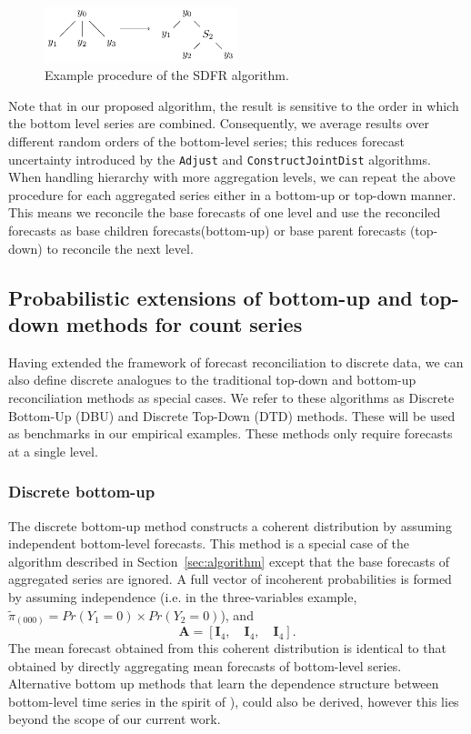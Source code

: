 \documentclass[a4paper,review,12pt,authoryear]{elsarticle}
\let\code=\texttt
\theoremstyle{definition}
\begin{document}
  \begin{figure}
    \centering
    \includegraphics[width=0.5\textwidth]{figures/sdfr.pdf}
    \caption{\label{fig:sdfr}Example procedure of the SDFR algorithm.}
  \end{figure}

  Note that in our proposed algorithm, the result is sensitive to the order in which the bottom level series are combined. Consequently, we average results over different random orders of the bottom-level series; this reduces forecast uncertainty introduced by the \code{Adjust} and \code{ConstructJointDist} algorithms.
  When handling hierarchy with more aggregation levels, we can repeat the above procedure for each aggregated series either in a bottom-up or top-down manner. This means we reconcile the base forecasts of one level and use the reconciled forecasts as base children forecasts(bottom-up) or base parent forecasts (top-down) to reconcile the next level.



    \subsection{Probabilistic extensions of bottom-up and top-down methods for count series}

    Having extended the framework of forecast reconciliation to discrete data, we can also define discrete analogues to the traditional top-down and bottom-up reconciliation methods as special cases. We refer to these algorithms as Discrete Bottom-Up (DBU) and Discrete Top-Down (DTD) methods. These will be used as benchmarks in our empirical examples. These methods only require forecasts at a single level.
    
    \subsubsection*{\textbf{Discrete bottom-up}}
    \label{sec:bottomup}

    The discrete bottom-up method constructs a coherent distribution by assuming independent bottom-level forecasts.
    This method is a special case of the algorithm described in Section~\ref{sec:algorithm} except that the base forecasts of aggregated series are ignored. A full vector of incoherent probabilities is formed by assuming independence (i.e. in the three-variables example, $\tilde{\pi}_{(000)} = Pr(Y_1=0)\times Pr(Y_2=0)$), and \[
    \mathbf{A} = [\mathbf{I}_4, \quad \mathbf{I}_4, \quad \mathbf{I}_4 ].
    \]
    The mean forecast obtained from this coherent distribution is identical to that obtained by directly aggregating mean forecasts of bottom-level series. Alternative bottom up methods that learn the dependence structure between bottom-level time series in the spirit of \citealp{bentaiebHierarchicalProbabilisticForecasting2020}), could also be derived, however this lies beyond the scope of our current work.
    
\end{document}
